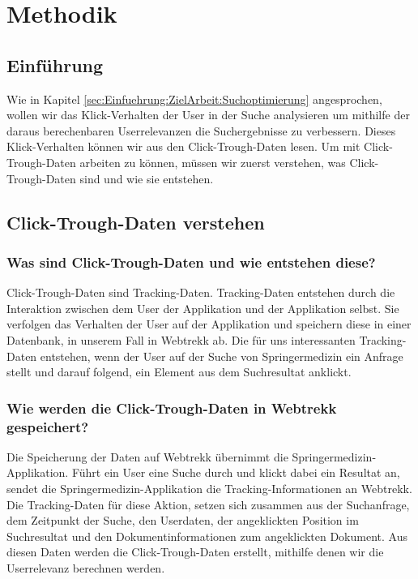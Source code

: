 \section{Methodik}
\label{sec:Einfuehrung:Methodik}

\subsection{Einführung}
\label{sec:Einfuehrung:Methodik:Einfuehrung}

Wie in Kapitel \ref{sec:Einfuehrung:ZielArbeit:Suchoptimierung} angesprochen, wollen wir das Klick-Verhalten der User in der Suche analysieren um mithilfe der daraus berechenbaren Userrelevanzen die Suchergebnisse zu verbessern. Dieses Klick-Verhalten können wir aus den Click-Trough-Daten lesen. Um mit Click-Trough-Daten arbeiten zu können, müssen wir zuerst verstehen, was Click-Trough-Daten sind und wie sie entstehen. 

\subsection{Click-Trough-Daten verstehen}
\label{sec:Einfuehrung:Methodik:Click-Trough-Daten}

\subsubsection{Was sind Click-Trough-Daten und wie entstehen diese?}
\label{sec:Einfuehrung:Methodik:Click-Trough-Daten:WasSindClick-Trough-Daten}

Click-Trough-Daten sind Tracking-Daten. Tracking-Daten entstehen durch die Interaktion zwischen dem User der Applikation und der Applikation selbst. Sie verfolgen das Verhalten der User auf der Applikation und speichern diese in einer Datenbank, in unserem Fall in Webtrekk ab. Die für uns interessanten Tracking-Daten entstehen, wenn der User auf der Suche von Springermedizin ein Anfrage stellt und darauf folgend, ein Element aus dem Suchresultat anklickt.

\subsubsection{Wie werden die Click-Trough-Daten in Webtrekk gespeichert?}
\label{sec:Einfuehrung:Methodik:Click-Trough-Daten:SpeichernClick-Trough-Daten}

Die Speicherung der Daten auf Webtrekk übernimmt die Springermedizin-Applikation. Führt ein User eine Suche durch und klickt dabei ein Resultat an, sendet die Springermedizin-Applikation die Tracking-Informationen an Webtrekk. Die Tracking-Daten für diese Aktion, setzen sich zusammen aus der Suchanfrage, dem Zeitpunkt der Suche, den Userdaten, der angeklickten Position im Suchresultat und den Dokumentinformationen zum angeklickten Dokument. Aus diesen Daten werden die Click-Trough-Daten erstellt, mithilfe denen wir die Userrelevanz berechnen werden.

